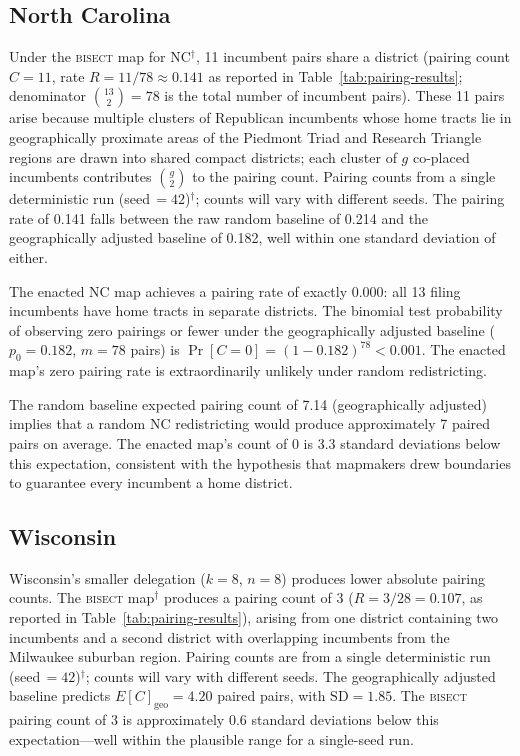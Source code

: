 \subsection{North Carolina}

Under the \textsc{bisect} map for NC$^\dagger$, 11 incumbent pairs share a district
(pairing count $C = 11$, rate $R = 11/78 \approx 0.141$ as reported in Table~\ref{tab:pairing-results};
denominator $\binom{13}{2} = 78$ is the total number of incumbent pairs).
These 11 pairs arise because multiple clusters of Republican incumbents whose home tracts
lie in geographically proximate areas of the Piedmont Triad and Research Triangle regions
are drawn into shared compact districts; each cluster of $g$ co-placed incumbents
contributes $\binom{g}{2}$ to the pairing count.
Pairing counts from a single deterministic run (seed\,$=42$)$^\dagger$; counts will vary with different seeds.
The pairing rate of 0.141 falls between the raw random baseline of 0.214 and the geographically adjusted
baseline of 0.182, well within one standard deviation of either.

The enacted NC map achieves a pairing rate of exactly 0.000: all 13 filing incumbents
have home tracts in separate districts. The binomial test probability of observing
zero pairings or fewer under the geographically adjusted baseline ($p_0 = 0.182$,
$m = 78$ pairs) is $\Pr[C = 0] = (1 - 0.182)^{78} < 0.001$. The enacted map's
zero pairing rate is extraordinarily unlikely under random redistricting.

The random baseline expected pairing count of 7.14 (geographically adjusted) implies
that a random NC redistricting would produce approximately 7 paired pairs on average.
The enacted map's count of 0 is 3.3 standard deviations below this expectation,
consistent with the hypothesis that mapmakers drew boundaries to guarantee every
incumbent a home district.

\subsection{Wisconsin}

Wisconsin's smaller delegation ($k=8$, $n=8$) produces lower absolute pairing counts.
The \textsc{bisect} map$^\dagger$ produces a pairing count of 3 ($R = 3/28 = 0.107$,
as reported in Table~\ref{tab:pairing-results}), arising from one district
containing two incumbents and a second district with overlapping incumbents from the
Milwaukee suburban region.
Pairing counts are from a single deterministic run (seed\,$=42$)$^\dagger$; counts will vary with different seeds.
The geographically adjusted baseline
predicts $E[C]_{\text{geo}} = 4.20$ paired pairs, with $\text{SD} = 1.85$. The
\textsc{bisect} pairing count of 3 is approximately 0.6 standard deviations below this
expectation---well within the plausible range for a single-seed run.

